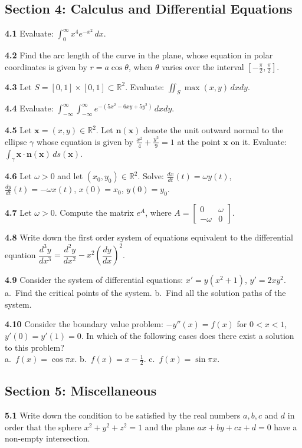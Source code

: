 \documentclass[11pt,a4paper]{article}
\newcommand{\R}{\mathbb{R}}
\newcommand{\examsec}[1]{%
  \subsection*{#1}
  \vspace{-2pt}
}
\newcommand{\qitem}[1]{\par\medskip\noindent\textbf{#1}\hspace{0.5em}}
\begin{document}
\examsec{Section 4: Calculus and Differential Equations}

\qitem{4.1} Evaluate: $\displaystyle\int_0^{\infty} x^4 e^{-x^2}\,dx$.

\qitem{4.2} Find the arc length of the curve in the plane, whose equation in polar coordinates is given by $r = a\cos\theta$, when $\theta$ varies over the interval $\left[-\frac{\pi}{2}, \frac{\pi}{2}\right]$.

\qitem{4.3} Let $S = [0, 1] \times [0, 1] \subset \R^2$. Evaluate: $\displaystyle\iint_S \max(x, y)\,dxdy$.

\qitem{4.4} Evaluate: $\displaystyle\int_{-\infty}^{\infty}\int_{-\infty}^{\infty} e^{-(5x^2 - 6xy + 5y^2)}\,dxdy$.

\qitem{4.5} Let $\mathbf{x} = (x, y) \in \R^2$. Let $\mathbf{n}(\mathbf{x})$ denote the unit outward normal to the ellipse $\gamma$ whose equation is given by $\frac{x^2}{4} + \frac{y^2}{9} = 1$ at the point $\mathbf{x}$ on it. Evaluate: $\displaystyle\int_\gamma \mathbf{x}\cdot\mathbf{n}(\mathbf{x})\,ds(\mathbf{x})$.

\qitem{4.6} Let $\omega > 0$ and let $(x_0, y_0) \in \R^2$. Solve: $\frac{dx}{dt}(t) = \omega y(t)$, $\frac{dy}{dt}(t) = -\omega x(t)$, $x(0) = x_0$, $y(0) = y_0$.

\qitem{4.7} Let $\omega > 0$. Compute the matrix $e^A$, where $A = \begin{bmatrix} 0 & \omega \\ -\omega & 0 \end{bmatrix}$.

\qitem{4.8} Write down the first order system of equations equivalent to the differential equation $\dfrac{d^3 y}{dx^3} = \dfrac{d^2 y}{dx^2} - x^2\left(\dfrac{dy}{dx}\right)^2$.

\qitem{4.9} Consider the system of differential equations: $x' = y(x^2 + 1)$, $y' = 2xy^2$.\\
a.\ Find the critical points of the system. \qquad b.\ Find all the solution paths of the system.

\qitem{4.10} Consider the boundary value problem: $-y''(x) = f(x)$ for $0 < x < 1$, $y'(0) = y'(1) = 0$. In which of the following cases does there exist a solution to this problem?\\
a.\ $f(x) = \cos\pi x$. \qquad b.\ $f(x) = x - \frac{1}{2}$. \qquad c.\ $f(x) = \sin\pi x$.

\examsec{Section 5: Miscellaneous}

\qitem{5.1} Write down the condition to be satisfied by the real numbers $a, b, c$ and $d$ in order that the sphere $x^2 + y^2 + z^2 = 1$ and the plane $ax + by + cz + d = 0$ have a non-empty intersection.
\end{document}
